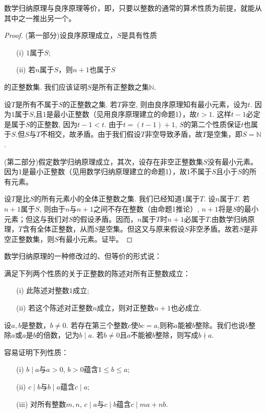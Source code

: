 \begin{proposition}{}{}
数学归纳原理与良序原理等价，即，只要以整数的通常的算术性质为前提，就能从其中之一推出另一个。
\end{proposition}
\begin{proof}
(第一部分)设良序原理成立，$S$是具有性质
\begin{enumerate}
\item[(i)] $1$属于$S$;
\item[(ii)] 若$n$属于$S$，则$n+1$也属于$S$
\end{enumerate}
的正整数集. 我们应该证明$S$是所有正整数之集$\mathbb{N}$.

设$T$是所有不属于$S$的正整数之集. 若$T$非空, 则由良序原理知有最小元素，设为$t$. 因为$1$属于$S$,且$1$是最小正整数（见用良序原理建立的命题1），故$t > 1$. 这样$t-1$必定是属于$S$的正整数, 因为$t-1<t$. 由于$t = (t-1) + 1$, $S$的第二个性质保证$t$也属于$S$.但$S$与$T$不相交，故矛盾。由于我们假设$T$非空导致矛盾，故$T$是空集，即$S = \mathbb{N}$.

(第二部分)假定数学归纳原理成立，其次，设存在非空正整数集$S$没有最小元素。因为$1$是最小正整数（见用数学归纳原理建立的命题1），故$1$不属于$S$且小于$S$的所有元素。

设$T$是比$S$的所有元素小的全体正整数之集. 我们已经知道$1$属于$T$. 设$n$属于$T$. 若$n+1$属于$S$, 则由于$n$与$n+1$之间不存在整数（由命题1推论）, $n+1$将是$S$的最小元素；但这与我们对$S$的假设矛盾。因而，$n$属于$T$时$n+1$必属于$T$.由数学归纳原理，$T$含有全体正整数，从而$S$是空集。但这又与原来假设$S$非空矛盾。故若$S$是非空正整数集，则$S$有最小元素。证毕。
\end{proof}

数学归纳原理的一种修改过的、但等价的形式说：

满足下列两个性质的关于正整数的陈述对所有正整数成立：
\begin{enumerate}
\item[(i)] 此陈述对整数$1$成立;
\item[(ii)] 若这个陈述对正整数$n$成立，则对正整数$n+1$也必成立.
\end{enumerate}

\begin{definition}{}{}
设$a, b$是整数，$b \neq 0$. 若存在第三个整数$c$使$bc = a$,则称$a$能被$b$整除。我们也说$b$整除$a$或$a$是$b$的倍数，记为$b \mid a$. 若$b \neq 0$且$a$不能被$b$整除，则写成$b \nmid a$.
\end{definition}

容易证明下列性质：
\begin{enumerate}
\item[(i)] $b \mid a$与$a > 0$, $b > 0$蕴含$1 \le b \le a$;
\item[(ii)] $c \mid b$与$b \mid a$蕴含$c \mid a$;
\item[(iii)] 对所有整数$m,n$, $c \mid a$与$c \mid b$蕴含$c \mid ma + nb$.
\end{enumerate}

